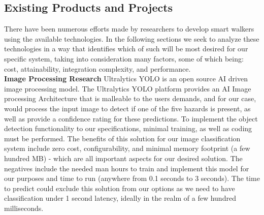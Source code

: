 \subsection{Existing Products and Projects}
\noindent There have been numerous efforts made by researchers to develop smart walkers using the available technologies. In the following sections we seek to analyze these technologies in a way that identifies which of such will be most desired for our specific system, taking into  consideration many factors, some of which being: cost, attainability, integration complexity, and performance.\\

\noindent \textbf{Image Processing Research}
\newline
 Ultralytics YOLO is an open source AI driven image processing model. The Ultralytics YOLO platform provides an AI Image processing Architecture that is malleable to the users demands, and for our case, would process the input image to detect if one of the five hazards is present, as well as provide a confidence rating for these predictions. To implement the object detection functionality to our specifications, minimal training, as well as coding must be performed. The benefits of this solution for our image classification system include zero cost, configurability, and minimal memory footprint (a few hundred MB) - which are all important aspects for our desired solution. The negatives include the needed man hours to train and implement this model for our purposes and time to run (anywhere from 0.1 seconds to 3 seconds). The time to predict could exclude this solution from our options as we need to have classification under 1 second latency, ideally in the realm of a few hundred milliseconds. 
\newline 


